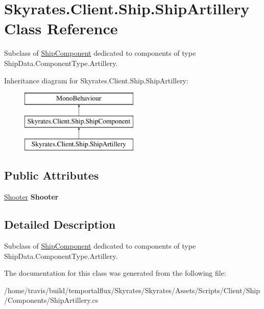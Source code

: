 \hypertarget{class_skyrates_1_1_client_1_1_ship_1_1_ship_artillery}{\section{Skyrates.\-Client.\-Ship.\-Ship\-Artillery Class Reference}
\label{class_skyrates_1_1_client_1_1_ship_1_1_ship_artillery}
}


Subclass of \hyperlink{class_skyrates_1_1_client_1_1_ship_1_1_ship_component}{Ship\-Component} dedicated to components of type Ship\-Data.\-Component\-Type.\-Artillery.  


Inheritance diagram for Skyrates.\-Client.\-Ship.\-Ship\-Artillery\-:\begin{figure}[H]
\begin{center}
\leavevmode
\includegraphics[height=3.000000cm]{class_skyrates_1_1_client_1_1_ship_1_1_ship_artillery}
\end{center}
\end{figure}
\subsection*{Public Attributes}
\begin{DoxyCompactItemize}
\item 
\hypertarget{class_skyrates_1_1_client_1_1_ship_1_1_ship_artillery_a9a605ca4a856e0f7000efac4b8442f77}{\hyperlink{class_shooter}{Shooter} {\bfseries Shooter}}\label{class_skyrates_1_1_client_1_1_ship_1_1_ship_artillery_a9a605ca4a856e0f7000efac4b8442f77}

\end{DoxyCompactItemize}


\subsection{Detailed Description}
Subclass of \hyperlink{class_skyrates_1_1_client_1_1_ship_1_1_ship_component}{Ship\-Component} dedicated to components of type Ship\-Data.\-Component\-Type.\-Artillery. 



The documentation for this class was generated from the following file\-:\begin{DoxyCompactItemize}
\item 
/home/travis/build/temportalflux/\-Skyrates/\-Skyrates/\-Assets/\-Scripts/\-Client/\-Ship/\-Components/Ship\-Artillery.\-cs\end{DoxyCompactItemize}
